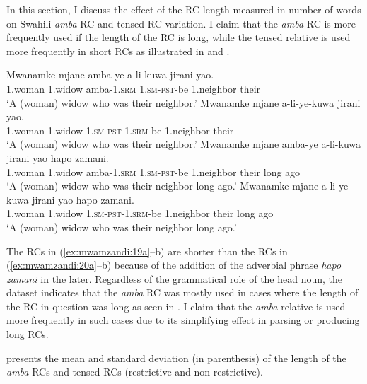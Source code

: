 \documentclass[output=paper,colorlinks,citecolor=brown]{langscibook}
\begin{document}
In this section, I discuss the effect of the RC length measured in number of words on Swahili \textit{amba} RC and tensed RC variation. I claim that the \textit{amba} RC is more frequently used if the length of the RC is long, while the tensed relative is used more frequently in short RCs as illustrated in  and .

\ea%
    \label{ex:mwamzandi:19}
    \ea%
    \label{ex:mwamzandi:19a}
    \gll    Mwanamke mjane amba-ye a-li-kuwa jirani yao.\\
            1.woman 1.widow amba\textsc{-1.srm} \textsc{1.sm-pst-}be 1.neighbor their\\
    \glt    ‘A (woman) widow who was their neighbor.’
    \ex%
    \label{ex:mwamzandi:19b}
    \gll    Mwanamke mjane a-li-ye-kuwa jirani yao.\\
            1.woman  1.widow  \textsc{1.sm-pst-1.srm-}be 1.neighbor their\\
    \glt    ‘A (woman) widow who was their neighbor.’
    \z
\ex%
    \label{ex:mwamzandi:20}
    \ea%
    \label{ex:mwamzandi:20a}
    \gll    Mwanamke mjane amba-ye a-li-kuwa jirani yao hapo zamani.\\
            1.woman  1.widow  amba\textsc{-1.srm} \textsc{1.sm-pst-}be 1.neighbor their long ago\\
    \glt    ‘A (woman) widow who was their neighbor long ago.’
    \ex%
    \label{ex:mwamzandi:20b}
    \gll    Mwanamke mjane a-li-ye-kuwa jirani yao hapo zamani.\\
            1.woman 1.widow \textsc{1.sm-pst-1.srm-}be 1.neighbor their long ago\\
    \glt    ‘A (woman) widow who was their neighbor long ago.’
    \z
\z

The RCs in (\ref{ex:mwamzandi:19a}--b) are shorter than the RCs in (\ref{ex:mwamzandi:20a}--b) because of the addition of the adverbial phrase \textit{hapo zamani} in the later. Regardless of the grammatical role of the head noun, the dataset indicates that the \textit{amba} RC was mostly used in cases where the length of the RC in question was long as seen in . I claim that the \textit{amba} relative is used more frequently in such cases due to its simplifying effect in parsing or producing long RCs.

 presents the mean and standard deviation (in parenthesis) of the length of the \textit{amba} RCs and tensed RCs (restrictive and non-restrictive).
\end{document}
